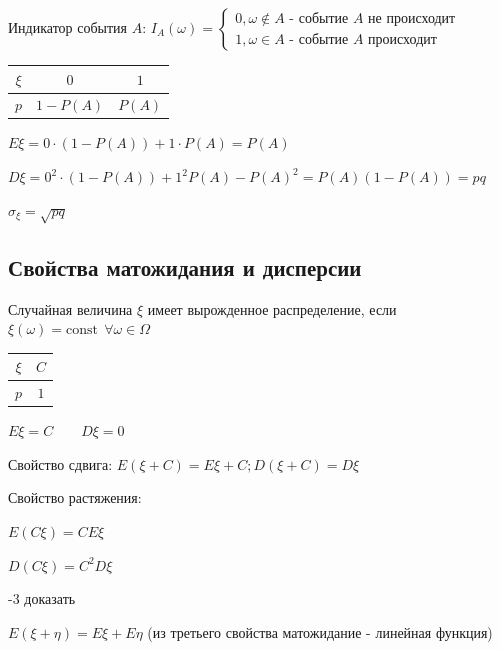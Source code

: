 \documentclass[12pt]{article}
\begin{document}
     Индикатор события $A$: $I_A (\omega) = \begin{cases}
                                                       0, \omega \notin A \text{ - событие } A \text{ не происходит} \\ 1, \omega \in A \text{ - событие } A \text{ происходит}
    \end{cases}$

    \begin{tabular}{c|c|c}
        $\xi$ & $0$        & $1$    \\
        \hline
        $p$   & $1 - P(A)$ & $P(A)$
    \end{tabular}

    $E\xi = 0 \cdot (1 - P(A)) + 1 \cdot P(A) = P(A)$

    $D\xi = 0^2 \cdot (1 - P(A)) + 1^2 P(A) - P(A)^2 = P(A) (1 - P(A)) = pq$

    $\sigma_\xi = \sqrt{pq}$

    \subsection{Свойства матожидания и дисперсии}

    \begin{MyTheorem}
         Случайная величина $\xi$ имеет вырожденное распределение, если $\xi(\omega) = \mathrm{const} \ \ \forall \omega \in \Omega$

        \begin{tabular}{c|c}
            $\xi$ & $C$ \\
            \hline
            $p$   & $1$
        \end{tabular}

        $E\xi = C \qquad D\xi = 0$
    \end{MyTheorem}

    \begin{MyTheorem}
         Свойство сдвига: $E(\xi + C) = E\xi + C; D (\xi + C) = D\xi$
    \end{MyTheorem}

    \begin{MyTheorem}
         Свойство растяжения:

        $E(C\xi) = CE\xi$

        $D(C\xi) = C^2 D\xi$
    \end{MyTheorem}

    -3 доказать

    \begin{MyTheorem}
         $E(\xi + \eta) = E\xi + E\eta$ (из третьего свойства матожидание - линейная функция)
    \end{MyTheorem}
\end{document}
